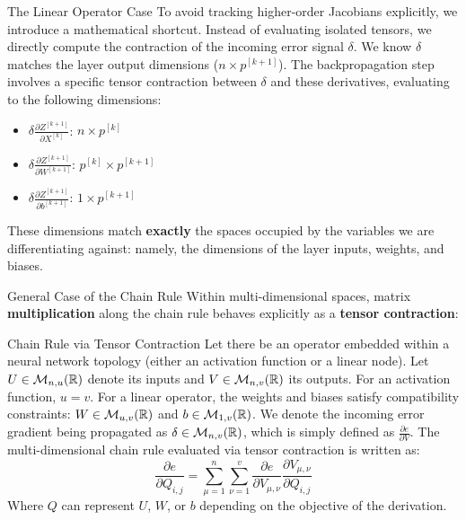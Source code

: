 \begin{frame}{The Linear Operator Case}
	To avoid tracking higher-order Jacobians explicitly, we introduce a mathematical shortcut. Instead of evaluating isolated tensors, we directly compute the contraction of the incoming error signal $\delta$. We know $\delta$ matches the layer output dimensions ($n \times p^{[k+1]}$). The backpropagation step involves a specific tensor contraction between $\delta$ and these derivatives, evaluating to the following dimensions:
	
	\begin{itemize}
		\item $\delta \frac{\partial{Z^{[k+1]}}}{\partial{X^{[k]}}}$: $n \times p^{[k]}$
		\item $\delta \frac{\partial{Z^{[k+1]}}}{\partial{W^{[k+1]}}}$: $p^{[k]} \times p^{[k+1]}$
		\item $\delta \frac{\partial{Z^{[k+1]}}}{\partial{b^{[k+1]}}}$: $1 \times p^{[k+1]}$
	\end{itemize}
	
	These dimensions match \textbf{exactly} the spaces occupied by the variables we are differentiating against: namely, the dimensions of the layer inputs, weights, and biases.
\end{frame}

\begin{frame}{General Case of the Chain Rule}
	Within multi-dimensional spaces, matrix \textbf{multiplication} along the chain rule behaves explicitly as a \textbf{tensor contraction}:
	
	\begin{block}{Chain Rule via Tensor Contraction}
		Let there be an operator embedded within a neural network topology (either an activation function or a linear node). Let $U \in \mathcal{M}_{n, u}(\mathbb{R})$ denote its inputs and $V \in \mathcal{M}_{n, v}(\mathbb{R})$ its outputs. For an activation function, $u = v$. For a linear operator, the weights and biases satisfy compatibility constraints: $W \in \mathcal{M}_{u, v}(\mathbb{R})$ and $b \in \mathcal{M}_{1, v}(\mathbb{R})$. We denote the incoming error gradient being propagated as $\delta \in \mathcal{M}_{n, v}(\mathbb{R})$, which is simply defined as $\frac{\partial{e}}{\partial{V}}$.
		The multi-dimensional chain rule evaluated via tensor contraction is written as:
		\begin{equation*}
			\frac{\partial{e}}{\partial{Q_{i,j}}} = \sum_{\mu=1}^n \sum_{\nu=1}^v \frac{\partial{e}}{\partial{V_{\mu,\nu}}} \frac{\partial{V_{\mu,\nu}}}{\partial{Q_{i,j}}}
		\end{equation*}
		Where $Q$ can represent $U$, $W$, or $b$ depending on the objective of the derivation.
	\end{block}
\end{frame}

